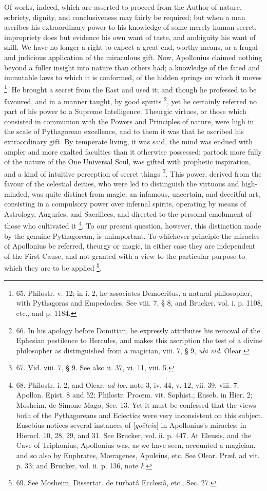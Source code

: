 Of works, indeed, which are
asserted to proceed from the Author of nature, sobriety, dignity, and
conclusiveness may fairly be required; but when a man ascribes his
extraordinary power to his knowledge of some merely human secret,
impropriety does but evidence his own want of taste, and ambiguity his
want of skill. We have no longer a right to expect a great end, worthy
means, or a frugal and judicious application of the miraculous gift.
Now, Apollonius claimed nothing beyond a fuller insight into nature
than others had; a knowledge of the fated and immutable laws to which
it is conformed, of the hidden springs on which it moves \footnote{65.
Philostr. v. 12; in i. 2, he associates Democritus, a natural
philosopher, with Pythagoras and Empedocles. See viii. 7, § 8, and
Brucker, vol. i. p. 1108, etc., and p. 1184.}. He brought a secret from the East and used it; and though he
professed to be favoured, and in a manner taught, by good spirits \footnote{66.
In his apology before Domitian, he expressly attributes his removal of
the Ephesian pestilence to Hercules, and makes this ascription the
test of a divine philosopher as distinguished from a magician, viii.
7, § 9, \emph{ubi vid}. Olear.}, yet he certainly referred no part of his power to a Supreme
Intelligence. Theurgic virtues, or those which consisted in communion
with the Powers and Principles of nature, were high in the scale of
Pythagorean excellence, and to them it was that he ascribed his
extraordinary gift. By temperate living, it was said, the mind was
endued with ampler and more exalted faculties than it otherwise
possessed; partook more fully of the nature of the One Universal Soul,
was gifted with prophetic inspiration, and a kind of intuitive
perception of secret things \footnote{67.
Vid. viii. 7, § 9. See also ii. 37, vi. 11, viii. 5.}.
This power, derived from the favour of the celestial deities, who were
led to distinguish the virtuous and high-minded, was quite distinct
from magic, an infamous, uncertain, and deceitful art, consisting in a
compulsory power over infernal spirits, operating by means of
Astrology, Auguries, and Sacrifices, and directed to the personal
emolument of those who cultivated it \footnote{68.
Philostr. i. 2, and Olear. \emph{ad loc}. note 3, iv. 44, v. 12, vii.
39, viii. 7; Apollon. Epist. 8 and 52; Philostr. Proœm. vit.
Sophist.; Euseb. in Hier. 2; Mosheim, de Simone Mago, Sec. 13. Yet it
must be confessed that the views both of the Pythagoreans and
Eclectics were very inconsistent on this subject. Eusebius notices
several instances of [\emph{go\={e}teia}] in Apollonius's miracles; in
Hierocl. 10, 28, 29, and 31. See Brucker, vol. ii. p. 447. At Eleusis,
and the Cave of Triphonius, Apollonius was, as we have seen, accounted
a magician, and so also by Euphrates, Mœragenes, Apuleius, etc. See
Olear. Præf. ad vit. p. 33; and Brucker, vol. ii. p. 136, note \emph{k}.}. To our present question, however, this distinction made
by the genuine Pythagorean, is unimportant. To whichever principle the
miracles of Apollonius be referred, theurgy or magic, in either case
they are independent of the First Cause, and not granted with a view
to the particular purpose to which they are to be applied \footnote{69.
See Mosheim, Dissertat. de turbatâ Ecclesiâ, etc., Sec. 27.}.

